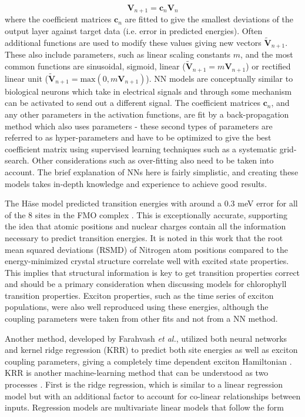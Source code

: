 \begin{equation}
	\mathbf{V}_{n+1} = \mathbf{c}_n \mathbf{V}_n	
\end{equation}
%
where the coefficient matrices $\mathbf{c}_n$ are fitted to give the smallest deviations
of the output layer against target data (i.e. error in predicted \Qy energies).
Often additional functions are used to modify these values giving new vectors $\tilde{\mathbf{V}}_{n+1}$.
These also include parameters, such as linear scaling constants $m$, and the most 
common functions are sinusoidal, sigmoid, linear ($\tilde{\mathbf{V}}_{n+1}=m \mathbf{V}_{n+1}$) 
or rectified linear unit ($\tilde{\mathbf{V}}_{n+1}=\text{max}\left(0, m \mathbf{V}_{n+1} \right)$). 
NN models are conceptually similar to biological neurons which take in electrical
signals and through some mechanism can be activated to send out a different signal.
The coefficient matrices $\mathbf{c}_n$, and any other parameters in the activation
functions, are fit by a back-propagation method which also uses parameters - these
second types of parameters are referred to as hyper-parameters and have to be optimized 
to give the best coefficient matrix using supervised learning techniques such as
a systematic grid-search. Other considerations such as over-fitting also need to 
be taken into account. The brief explanation of NNs here is fairly simplistic, and
creating these models takes in-depth knowledge and experience to achieve good results.

The H\"{a}se model predicted \Qy transition energies with around a 0.3 meV error
for all of the 8 sites in the FMO complex \cite{AspuruGuzik2016}. This is exceptionally
accurate, supporting the idea that atomic positions and nuclear charges contain 
all the information necessary to predict transition energies. It is noted in this
work that the root mean squared deviations (RSMD) of Nitrogen atom positions compared 
to the energy-minimized crystal structure correlate well with excited state properties. 
This implies that structural information is key to get transition properties correct and should be
a primary consideration when discussing models for chlorophyll transition properties.
Exciton properties, such as the time series of exciton populations, were also well 
reproduced using these \Qy energies, although the coupling parameters were taken 
from other fits and not from a NN method.

Another method, developed by Farahvash \emph{et al.}, utilized both neural networks
and kernel ridge regression (KRR) to predict both site energies as well as exciton 
coupling parameters, giving a completely time dependent exciton Hamiltonian \cite{Farahvash2020}. 
KRR is another machine-learning method that can be understood as two processes \cite{Hastie2009}. 
First is the ridge regression, which is similar to a linear regression model but 
with an additional factor to account for co-linear relationships between inputs.
Regression models are multivariate linear models that follow the form

